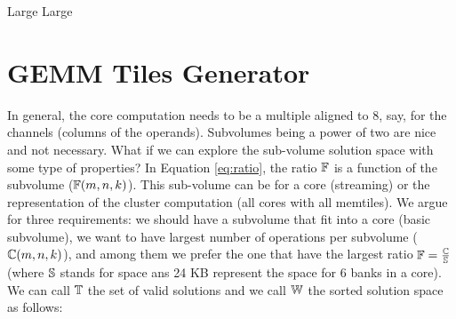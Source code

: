 \documentclass[journal]{IEEEtran}
\begin{document}
\begin{algorithm}
  \caption{Large Large}
  \label{alg:one2}
  \begin{algorithmic}[1]
      \ENDFOR
    \ENDFOR
  \end{algorithmic}  
\end{algorithm}

\newpage 
\section{GEMM Tiles Generator}
In general, the core computation needs to be a multiple aligned to
$8$, say, for the channels (columns of the operands). Subvolumes being
a power of two are nice and not necessary. What if we can explore the
sub-volume solution space with some type of properties? In Equation
\ref{eq:ratio}, the ratio $\mathbb{F}$ is a function of the subvolume
($\mathbb{F}(m,n,k)$). This sub-volume can be for a core (streaming) or the
representation of the cluster computation (all cores with all
memtiles). We argue for three requirements: we should have a subvolume
that fit into a core (basic subvolume), we want to have largest number
of operations per subvolume ($\mathbb{C}(m,n,k)$), and among them we prefer
the one that have the largest ratio $\mathbb{F} = \frac{\mathbb{C}}{\mathbb{S}}$ (where $\mathbb{S}$
stands for space ans 24 KB represent the space for 6 banks in a
core). We can call $\mathbb{T}$ the set of valid solutions and we call $\mathbb{W}$
the sorted solution space as follows:
\end{document}
